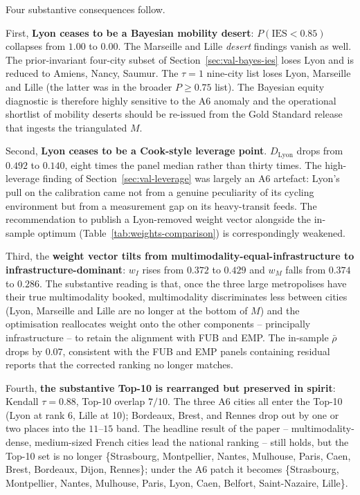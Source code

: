 \documentclass[11pt,a4paper]{article}
\newcommand{\IES}{\mathrm{IES}}
\begin{document}
Four substantive consequences follow.

First, \textbf{Lyon ceases to be a Bayesian mobility desert}:
$P(\IES < 0.85)$ collapses from $1.00$ to $0.00$. The Marseille
and Lille \emph{desert} findings vanish as well. The
prior-invariant four-city subset of Section~\ref{sec:val-bayes-ies}
loses Lyon and is reduced to Amiens, Nancy, Saumur. The
$\tau = 1$ nine-city list loses Lyon, Marseille and Lille (the
latter was in the broader $P \geq 0.75$ list). The Bayesian
equity diagnostic is therefore highly sensitive to the A6 anomaly
and the operational shortlist of mobility deserts should be
re-issued from the Gold Standard release that ingests the
triangulated $M$.

Second, \textbf{Lyon ceases to be a Cook-style leverage point}.
$D_{\text{Lyon}}$ drops from $0.492$ to $0.140$, eight times the
panel median rather than thirty times. The high-leverage finding
of Section~\ref{sec:val-leverage} was largely an A6 artefact:
Lyon's pull on the calibration came not from a genuine peculiarity
of its cycling environment but from a measurement gap on its
heavy-transit feeds. The recommendation to publish a Lyon-removed
weight vector alongside the in-sample optimum
(Table~\ref{tab:weights-comparison}) is correspondingly weakened.

Third, the \textbf{weight vector tilts from
multimodality-equal-infrastructure to infrastructure-dominant}:
$w_I$ rises from $0.372$ to $0.429$ and $w_M$ falls from $0.374$
to $0.286$. The substantive reading is that, once the three large
metropolises have their true multimodality booked, multimodality
discriminates less between cities (Lyon, Marseille and Lille are
no longer at the bottom of $M$) and the optimisation reallocates
weight onto the other components -- principally infrastructure --
to retain the alignment with FUB and EMP. The in-sample
$\bar\rho$ drops by $0.07$, consistent with the FUB and EMP
panels containing residual reports that the corrected ranking no
longer matches.

Fourth, \textbf{the substantive Top-10 is rearranged but
preserved in spirit}: Kendall $\tau = 0.88$, Top-10 overlap $7
/ 10$. The three A6 cities all enter the Top-10 (Lyon at rank 6,
Lille at 10); Bordeaux, Brest, and Rennes drop out by one or two
places into the $11$--$15$ band. The headline result of the
paper -- multimodality-dense, medium-sized French cities lead the
national ranking -- still holds, but the Top-10 set is no longer
\{Strasbourg, Montpellier, Nantes, Mulhouse, Paris, Caen, Brest,
Bordeaux, Dijon, Rennes\}; under the A6 patch it becomes
\{Strasbourg, Montpellier, Nantes, Mulhouse, Paris, Lyon, Caen,
Belfort, Saint-Nazaire, Lille\}.
\end{document}
